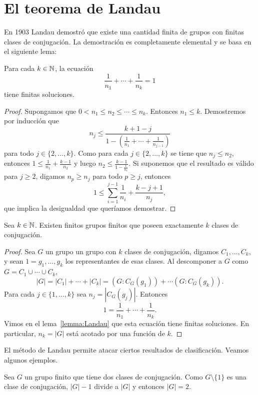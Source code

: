 \chapter{El teorema de Landau}

En 1903 Landau demostró que existe una cantidad finita de grupos
con finitas clases de conjugación. La demostración es completamente 
elemental y se basa en el siguiente lema: 

\begin{lemma}[Landau]
  \label{lemma:Landau}
  Para cada $k\in\mathbb{N}$, la ecuación 
  \[
	\frac{1}{n_1}+\cdots+\frac{1}{n_k}=1
  \]
  tiene finitas soluciones.
\end{lemma}

\begin{proof}
  Supongamos que $0<n_1\leq n_2\leq\cdots\leq n_k$.  Entonces $n_1\leq k$.
  Demostremos por inducción que 
  \[
    n_j\leq \frac{k+1-j}{1-\left(\frac{1}{n_1}+\cdots+\frac{1}{n_{j-1}}\right)}
  \]
  para todo $j\in\{2,\dots,k\}$. Como para cada $j\in\{2,\dots,k\}$ se tiene
  que $n_j\leq n_2$, entonces $1\leq \frac{1}{n_1}+\frac{k-1}{n_2}$ y luego
  $n_2\leq \frac{k-1}{1-\frac{1}{n_1}}$. Si suponemos que el resultado es
  válido para $j\geq2$, digamos $n_p\geq n_j$ para todo $p\geq j$, entonces
  \[
	1\leq \sum_{i=1}^{j-1}\frac{1}{n_i}+\frac{k-j+1}{n_j},
  \]
  que implica la desigualdad que queríamos demostrar.
\end{proof}

\begin{theorem}[Landau]
  Sea $k\in\mathbb{N}$. Existen finitos grupos finitos que poseen exactamente $k$
  clases de conjugación.
\end{theorem}

\begin{proof}
  Sea $G$ un grupo un grupo con $k$ clases de conjugación, digamos
  $C_1,\dots,C_k$, y sean $1=g_1,\dots,g_k$ los representantes de esas clases.
  Al descomponer a $G$ como $G=C_1\cup\cdots\cup C_k$, 
  \[
    |G|=|C_1|+\cdots+|C_k|=(G:C_G(g_1))+\cdots(G:C_G(g_k)).
  \]
  Para cada $j\in\{1,\dots,k\}$ sea $n_j=|C_G(g_j)|$. Entonces 
  \[
	1=\frac{1}{n_1}+\cdots+\frac{1}{n_k}.
  \]
  Vimos en el lema~\ref{lemma:Landau} que esta ecuación tiene finitas
  soluciones.  En particular, $n_k=|G|$ está acotado por una función de $k$.
\end{proof}

El método de Landau permite atacar ciertos resultados de clasificación. 
Veamos algunos ejemplos. 

\begin{example}
  Sea $G$ un grupo finito que tiene dos clases de conjugación. Como 
  $G\setminus\{1\}$ es una clase de conjugación, $|G|-1$ divide a
  $|G|$ y entonces $|G|=2$.
\end{example}


